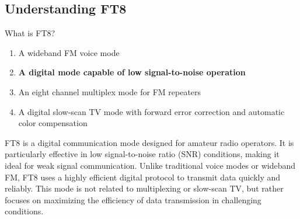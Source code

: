 \subsection{Understanding FT8}
\label{T8D13}

\begin{tcolorbox}[colback=gray!10!white,colframe=black!75!black,title=T8D13]
What is FT8?
\begin{enumerate}[noitemsep]
    \item A wideband FM voice mode
    \item \textbf{A digital mode capable of low signal-to-noise operation}
    \item An eight channel multiplex mode for FM repeaters
    \item A digital slow-scan TV mode with forward error correction and automatic color compensation
\end{enumerate}
\end{tcolorbox}

FT8 is a digital communication mode designed for amateur radio operators. It is particularly effective in low signal-to-noise ratio (SNR) conditions, making it ideal for weak signal communication. Unlike traditional voice modes or wideband FM, FT8 uses a highly efficient digital protocol to transmit data quickly and reliably. This mode is not related to multiplexing or slow-scan TV, but rather focuses on maximizing the efficiency of data transmission in challenging conditions.